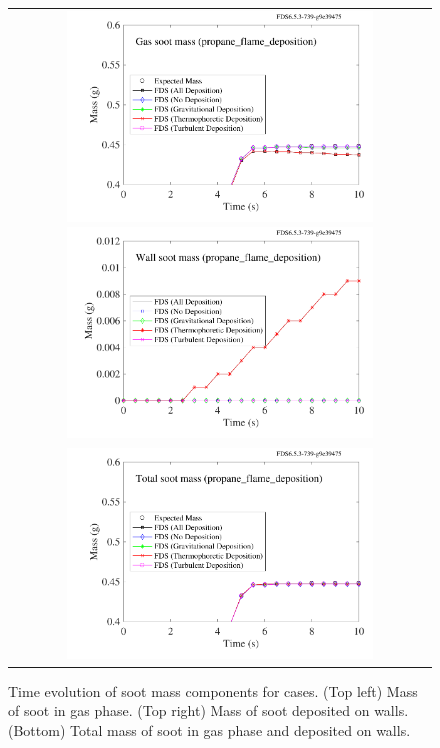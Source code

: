 \documentclass[11pt]{book}
\begin{document}
\begin{figure}[ht]
    \centering
    \begin{tabular}{c}
        \includegraphics[height=2.2in]{SCRIPT_FIGURES/propane_flame_deposition_gas}
        \includegraphics[height=2.2in]{SCRIPT_FIGURES/propane_flame_deposition_wall} \\
        \includegraphics[height=2.2in]{SCRIPT_FIGURES/propane_flame_deposition_total}
    \end{tabular}
    \caption[Soot mass conservation for  case]{Time evolution of soot mass components for  cases. (Top left) Mass of soot in gas phase. (Top right) Mass of soot deposited on walls. (Bottom) Total mass of soot in gas phase and deposited on walls.}
    \label{fig:deposition_mass}
\end{figure}
\end{document}
